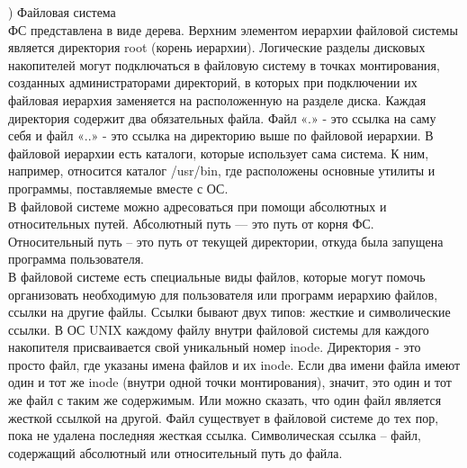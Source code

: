 ) Файловая система \\
ФС представлена в виде дерева. Верхним элементом иерархии файловой системы является директория root (корень иерархии). Логические разделы дисковых накопителей могут подключаться в файловую систему в точках монтирования, созданных администраторами директорий, в которых при подключении их файловая иерархия заменяется на расположенную на разделе диска. Каждая директория содержит два обязательных файла. Файл «.» - это ссылка на саму себя и файл «..» - это ссылка на директорию выше по файловой иерархии. В файловой иерархии есть каталоги, которые использует сама система. К ним, например, относится каталог /usr/bin, где расположены основные утилиты и программы, поставляемые вместе с ОС. \\
В файловой системе можно адресоваться при помощи абсолютных и относительных путей. Абсолютный путь — это путь от корня ФС. Относительный путь – это путь от текущей директории, откуда была запущена программа пользователя. \\
В файловой системе есть специальные виды файлов, которые могут помочь организовать необходимую для пользователя или программ иерархию файлов, ссылки на другие файлы. Ссылки бывают двух типов: жесткие и символические ссылки. В ОС UNIX каждому файлу внутри файловой системы для каждого накопителя присваивается свой уникальный номер inode. Директория - это просто файл, где указаны имена файлов и их inode. Если два имени файла имеют один и тот же inode (внутри одной точки монтирования), значит, это один и тот же файл с таким же содержимым. Или можно сказать, что один файл является жесткой ссылкой на другой. Файл существует в файловой системе до тех пор, пока не удалена последняя жесткая ссылка. Символическая ссылка – файл, содержащий абсолютный или относительный путь до файла. \\

